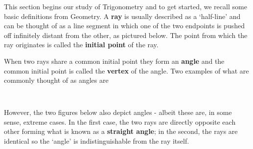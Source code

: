 \documentclass[12pt]{ximera}
\begin{document}
\setcounter{footnote}{0}

\label{Angles}

This section begins our study of Trigonometry and to get started, we recall some basic definitions from Geometry.  A  \textbf{ray} is usually described as a `half-line' and can be thought of as a line segment in which one of the two endpoints is pushed off infinitely distant from the other, as pictured below.  The point from which the ray originates is called the  \textbf{initial point} of the ray.

\begin{center}



\end{center}

When two rays share a common initial point they form an  \textbf{angle} and the common initial point is called the \textbf{vertex} of the angle.  Two  examples of what are commonly thought of as angles are

\[ \begin{array}{cc}

  

&

\hspace{1.75in}

   \\ \end{array} \]

However, the two figures below also depict angles - albeit these are, in some sense, extreme cases.  In the first case, the two rays are directly opposite each other forming what is known as a \textbf{straight angle}; in the second, the rays are identical so the `angle' is indistinguishable from the ray itself.
\end{document}
